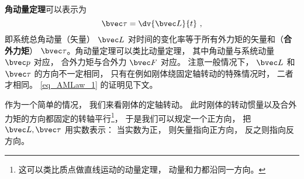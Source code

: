 
\textbf{角动量定理}可以表示为
\begin{equation}\label{eq_AMLaw_1}
\bvec \tau = \dv{\bvec L}{t}~,
\end{equation}
即系统总角动量（矢量） $\bvec L$ 对时间的变化率等于所有外力矩的矢量和（\textbf{合外力矩}） $\bvec \tau$。角动量定理可以类比动量定理， 其中角动量与系统动量 $\bvec p$ 对应， 合外力矩与合外力 $\bvec F$ 对应。 注意一般情况下， $\bvec L$ 和 $\bvec \tau$ 的方向不一定相同， 只有在例如刚体绕固定轴转动的特殊情况时， 二者才相同。 \autoref{eq_AMLaw_1} 的证明见下文。

作为一个简单的情况， 我们来看刚体的定轴转动。 此时刚体的转动惯量以及合外力矩的方向都固定的转轴平行\footnote{这可以类比质点做直线运动的动量定理， 动量和力都沿同一方向。}， 于是我们可以规定一个正方向， 把 $\bvec L, \bvec \tau$ 用实数表示： 当实数为正， 则矢量指向正方向， 反之则指向反方向。

